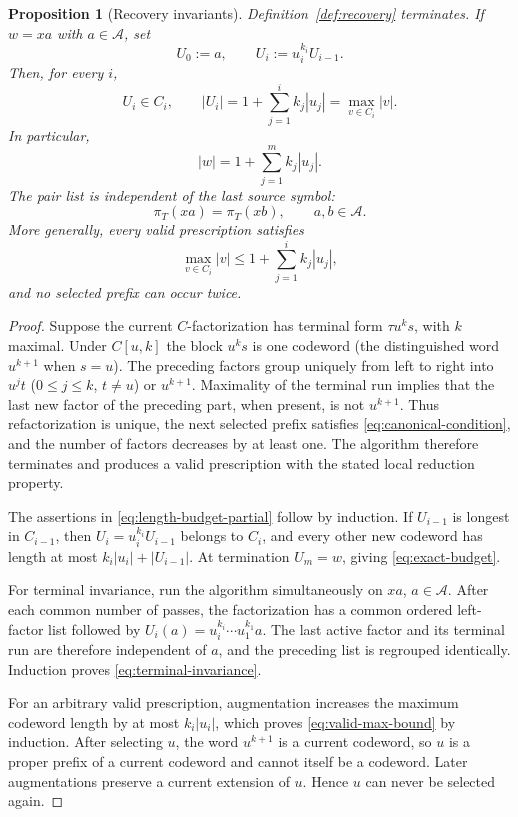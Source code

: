 \documentclass[journal]{IEEEtran}
\theoremstyle{plain}
\newtheorem{proposition}[theorem]{Proposition}
\theoremstyle{definition}
\theoremstyle{remark}
\newcommand{\A}{\mathcal A}
\begin{document}
\begin{proposition}[Recovery invariants]\label{prop:recovery}
Definition~\ref{def:recovery} terminates.  If $w=xa$ with $a\in\A$, set
\begin{equation*}
 U_0:=a,
 \qquad
 U_i:=u_i^{k_i}U_{i-1}.
\end{equation*}
Then, for every $i$,
\begin{equation}\label{eq:length-budget-partial}
 U_i\in C_i,
 \qquad
 |U_i|=1+\sum_{j=1}^ik_j|u_j|
 =\max_{v\in C_i}|v|.
\end{equation}
In particular,
\begin{equation}\label{eq:exact-budget}
 |w|=1+\sum_{j=1}^m k_j|u_j|.
\end{equation}
The pair list is independent of the last source symbol:
\begin{equation}\label{eq:terminal-invariance}
 \pi_T(xa)=\pi_T(xb),\qquad a,b\in\A.
\end{equation}
More generally, every valid prescription satisfies
\begin{equation}\label{eq:valid-max-bound}
 \max_{v\in C_i}|v|\le 1+\sum_{j=1}^i k_j|u_j|,
\end{equation}
and no selected prefix can occur twice.
\end{proposition}

\begin{proof}
Suppose the current $C$-factorization has terminal form $\tau u^ks$, with $k$ maximal.  Under $C[u,k]$ the block $u^ks$ is one codeword (the distinguished word $u^{k+1}$ when $s=u$).  The preceding factors group uniquely from left to right into $u^jt$ ($0\le j\le k$, $t\ne u$) or $u^{k+1}$.  Maximality of the terminal run implies that the last new factor of the preceding part, when present, is not $u^{k+1}$.  Thus refactorization is unique, the next selected prefix satisfies \eqref{eq:canonical-condition}, and the number of factors decreases by at least one.  The algorithm therefore terminates and produces a valid prescription with the stated local reduction property.

The assertions in \eqref{eq:length-budget-partial} follow by induction.  If $U_{i-1}$ is longest in $C_{i-1}$, then $U_i=u_i^{k_i}U_{i-1}$ belongs to $C_i$, and every other new codeword has length at most $k_i|u_i|+|U_{i-1}|$.  At termination $U_m=w$, giving \eqref{eq:exact-budget}.

For terminal invariance, run the algorithm simultaneously on $xa$, $a\in\A$.  After each common number of passes, the factorization has a common ordered left-factor list followed by $U_i(a)=u_i^{k_i}\cdots u_1^{k_1}a$.  The last active factor and its terminal run are therefore independent of $a$, and the preceding list is regrouped identically.  Induction proves \eqref{eq:terminal-invariance}.

For an arbitrary valid prescription, augmentation increases the maximum codeword length by at most $k_i|u_i|$, which proves \eqref{eq:valid-max-bound} by induction.  After selecting $u$, the word $u^{k+1}$ is a current codeword, so $u$ is a proper prefix of a current codeword and cannot itself be a codeword.  Later augmentations preserve a current extension of $u$.  Hence $u$ can never be selected again.
\end{proof}
\end{document}
